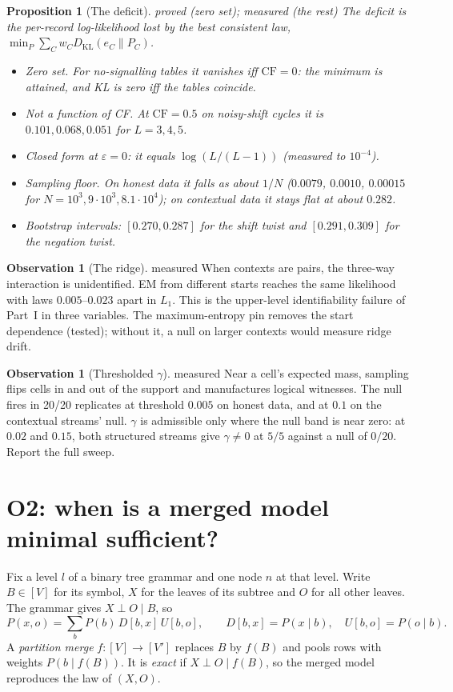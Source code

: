 \documentclass[11pt]{article}
\newtheorem{proposition}[theorem]{Proposition}
\theoremstyle{definition}
\newtheorem{observation}[theorem]{Observation}
\theoremstyle{remark}
\newcommand{\CF}{\mathrm{CF}}
\newcommand{\KL}{D_{\mathrm{KL}}}
\newcommand{\st}[1]{\textsf{\small\color{gray}#1}}
\begin{document}
\begin{proposition}[The deficit]\label{res:auto23}\st{proved (zero set); measured (the rest)}
The \emph{deficit} is the per-record log-likelihood lost by the best consistent law, $\min_P\sum_C w_C\KL(e_C\|P_C)$.
\begin{itemize}
  \item \emph{Zero set.} For no-signalling tables it vanishes iff $\CF=0$: the minimum is attained, and KL is zero iff the tables coincide.
  \item \emph{Not a function of CF.} At $\CF=0.5$ on noisy-shift cycles it is $0.101,0.068,0.051$ for $L=3,4,5$.
  \item \emph{Closed form at $\varepsilon=0$:} it equals $\log(L/(L-1))$ (measured to $10^{-4}$).
  \item \emph{Sampling floor.} On honest data it falls as about $1/N$ ($0.0079$, $0.0010$, $0.00015$ for $N=10^3,9\cdot10^3,8.1\cdot10^4$); on contextual data it stays flat at about $0.282$.
  \item \emph{Bootstrap intervals:} $[0.270,0.287]$ for the shift twist and $[0.291,0.309]$ for the negation twist.
\end{itemize}
\end{proposition}
\begin{observation}[The ridge]\label{res:auto24}\st{measured}
When contexts are pairs, the three-way interaction is unidentified. EM from different starts reaches the same likelihood with laws $0.005$--$0.023$ apart in $L_1$. This is the upper-level identifiability failure of Part~I in three variables. The maximum-entropy pin removes the start dependence (tested); without it, a null on larger contexts would measure ridge drift.
\end{observation}
\begin{observation}[Thresholded $\gamma$]\label{res:auto25}\st{measured}
Near a cell's expected mass, sampling flips cells in and out of the support and manufactures logical witnesses. The null fires in 20/20 replicates at threshold $0.005$ on honest data, and at $0.1$ on the contextual streams' null. $\gamma$ is admissible only where the null band is near zero: at $0.02$ and $0.15$, both structured streams give $\gamma\ne0$ at $5/5$ against a null of $0/20$. Report the full sweep.
\end{observation}

\section{O2: when is a merged model minimal sufficient?}\label{sec:o2}
Fix a level $l$ of a binary tree grammar and one node $n$ at that level. Write $B\in[V]$ for its symbol, $X$ for the leaves of its subtree and $O$ for all other leaves. The grammar gives $X\perp O\mid B$, so
\[
P(x,o)=\sum_b P(b)\,D[b,x]\,U[b,o],\qquad D[b,x]=P(x\mid b),\quad U[b,o]=P(o\mid b).
\]
A \emph{partition merge} $f:[V]\to[V']$ replaces $B$ by $f(B)$ and pools rows with weights $P(b\mid f(B))$. It is \emph{exact} if $X\perp O\mid f(B)$, so the merged model reproduces the law of $(X,O)$.
\end{document}
